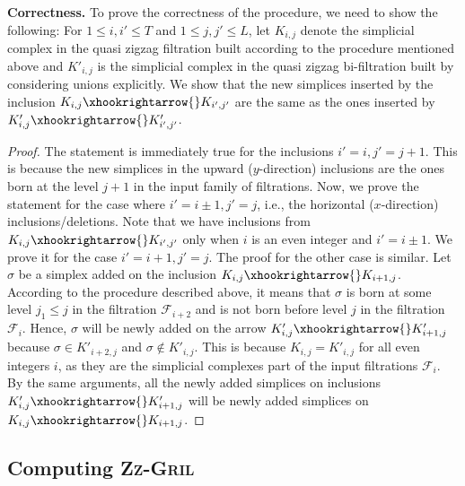 \documentclass{article}
\newcommand{\zzgril}{\textsc{Zz-Gril}}
\theoremstyle{plain}
\theoremstyle{definition}
\theoremstyle{remark}
\begin{document}
\textbf{Correctness.} To prove the correctness of the procedure, we need to show 
the following: For $1\leq i,i' \leq T$ and $1\leq j,j' \leq L$, let $K_{i,j}$ denote the simplicial complex in the quasi zigzag filtration built according to the procedure mentioned above and $K'_{i,j}$ is the simplicial complex in the quasi zigzag bi-filtration built by considering unions explicitly. We show
that the new simplices inserted by the inclusion $K_{i,j} \xhookrightarrow{} K_{i',j'}$ are the same as the ones inserted by $K'_{i,j} \xhookrightarrow{} K'_{i',j'}$. 
\begin{proof}
    The statement is immediately true for the inclusions $i'= i, j' = j+1$. This is because the new simplices in the upward ($y$-direction) inclusions are the ones born at the level $j+1$ in the input family of filtrations. Now, we prove the statement for the case where $i' = i \pm 1, j' = j$, i.e., the horizontal ($x$-direction) inclusions/deletions. Note that we have inclusions from $K_{i,j} \xhookrightarrow{} K_{i',j'}$ only when $i$ is an even integer and $i' = i \pm 1$. We prove it for the case $i' = i + 1, j' = j$. The proof for the other case is similar. Let $\sigma$ be a simplex added on the inclusion $K_{i,j} \xhookrightarrow{} K_{i+1,j}$. According to the procedure described above, it means that $\sigma$ is born at some level $j_1 \leq j$ in the filtration $\mathcal{F}_{i+2}$ and is not born before level $j$ in the filtration $\mathcal{F}_i$. Hence, $\sigma$ will be newly added on the arrow $K'_{i,j} \xhookrightarrow{} K'_{i+1,j}$ because $\sigma \in K'_{i+2,j}$ and $\sigma \notin K'_{i,j}$. This is because $K_{i,j} = K'_{i,j}$ for all even integers $i$, as they are the simplicial complexes part of the input filtrations $\mathcal{F}_i$. By the same arguments, all the newly added simplices on inclusions $K'_{i,j} \xhookrightarrow{} K'_{i+1,j}$ will be newly added simplices on $K_{i,j} \xhookrightarrow{} K_{i+1,j}$.
\end{proof}






\subsection{Computing \zzgril}
\end{document}
